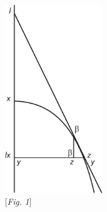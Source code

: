 \pend
\vspace{2em}
\pstart
\noindent
\centering             
 \includegraphics[trim = 0mm -3mm 0mm 0mm, clip,width=0.32\textwidth]{images/lh03705_007r-d1.pdf}\\
 \noindent \centering {} [\textit{Fig. 1}] %
\pend